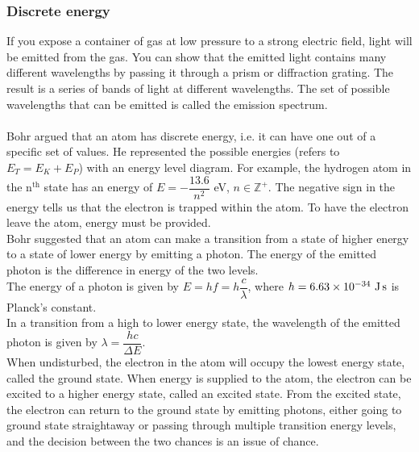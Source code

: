 \documentclass[a4paper,12pt]{article}
\begin{document}
\subsubsection*{Discrete energy}
If you expose a container of gas at low pressure to a strong electric field, light will be emitted from the gas. You can show that the emitted light contains many different wavelengths by passing it through a prism or diffraction grating. The result is a series of bands of light at different wavelengths. The set of possible wavelengths that can be emitted is called the emission spectrum.\\\\
Bohr argued that an atom has discrete energy, i.e. it can have one out of a specific set of values. He represented the possible energies (refers to $E_T=E_K+E_P$) with an energy level diagram. For example, the hydrogen atom in the n$^\text{th}$ state has an energy of $E=-\dfrac{13.6}{n^2}$ eV, $n\in \mathbb{Z^+}$. The negative sign in the energy tells us that the electron is trapped within the atom. To have the electron leave the atom, energy must be provided.\\
Bohr suggested that an atom can make a transition from a state of higher energy to a state of lower energy by emitting a photon. The energy of the emitted photon is the difference in energy of the two levels. \\
The energy of a photon is given by $E=hf=h\dfrac{c}{\lambda}$, where $h=6.63\times 10^{-34}\ \text{J\,s}$ is Planck's constant.\\
In a transition from a high to lower energy state, the wavelength of the emitted photon is given by $\lambda=\dfrac{hc}{\Delta E}$.\\
When undisturbed, the electron in the atom will occupy the lowest energy state, called the ground state. When energy is supplied to the atom, the electron can be excited to a higher energy state, called an excited state. From the excited state, the electron can return to the ground state by emitting photons, either going to ground state straightaway or passing through multiple transition energy levels, and the decision between the two chances is an issue of chance.
\end{document}
